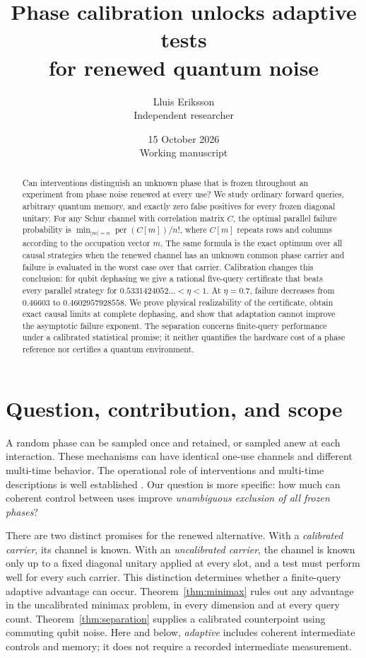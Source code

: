 \documentclass[11pt,a4paper]{article}
\title{Phase calibration unlocks adaptive tests\\for renewed quantum noise}
\author{Lluis Eriksson\\\small Independent researcher}
\date{15 October 2026\\\small Working manuscript}
\theoremstyle{remark}
\DeclareMathOperator{\per}{per}
\begin{document}
\maketitle
\begin{abstract}
Can interventions distinguish an unknown phase that is frozen throughout an
experiment from phase noise renewed at every use? We study ordinary forward
queries, arbitrary quantum memory, and exactly zero false positives for every
frozen diagonal unitary. For any Schur channel with correlation matrix \(C\),
the optimal parallel failure probability is
\(\min_{|m|=n}\per(C[m])/n!\), where \(C[m]\) repeats rows and columns according
to the occupation vector \(m\). The same formula is the exact optimum over
all causal strategies when the renewed channel has an unknown common phase
carrier and failure is evaluated in the worst case over that carrier.
Calibration changes this conclusion: for qubit dephasing we give a rational
five-query certificate that beats every parallel strategy for
\(0.5331424052\ldots<\eta<1\). At \(\eta=0.7\), failure decreases from
\(0.46603\) to \(0.4602957928558\). We prove physical realizability of the
certificate, obtain exact causal limits at complete dephasing, and show that
adaptation cannot improve the asymptotic failure exponent. The separation
concerns finite-query performance under a calibrated statistical promise;
it neither quantifies the hardware cost of a phase reference nor certifies
a quantum environment.
\end{abstract}

\section{Question, contribution, and scope}

A random phase can be sampled once and retained, or sampled anew at each
interaction. These mechanisms can have identical one-use channels and
different multi-time behavior. The operational role of interventions and
multi-time descriptions is well established \cite{pollock}. Our question is
more specific: how much can coherent control between uses improve
\emph{unambiguous exclusion of all frozen phases}?

There are two distinct promises for the renewed alternative. With a
\emph{calibrated carrier}, its channel is known. With an \emph{uncalibrated
carrier}, the channel is known only up to a fixed diagonal unitary applied
at every slot, and a test must perform well for every such carrier. This
distinction determines whether a finite-query adaptive advantage can occur.
Theorem~\ref{thm:minimax} rules out any advantage in the uncalibrated minimax
problem, in every dimension and at every query count.
Theorem~\ref{thm:separation} supplies a calibrated counterpoint using
commuting qubit noise. Here and below, \emph{adaptive} includes coherent
intermediate controls and memory; it does not require a recorded intermediate
measurement.
\end{document}
